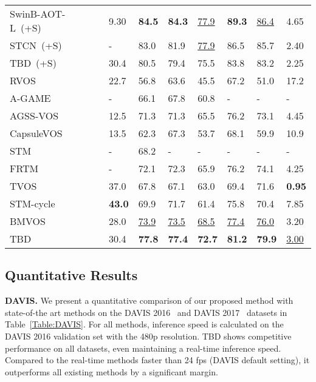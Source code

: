 \documentclass[runningheads]{llncs}
\begin{document}
\begin{table}[h!]
\begin{tabular}{lP{0.8cm}P{1cm}P{1cm}P{1cm}P{1cm}P{1cm}P{1cm}P{1cm}}
		SwinB-AOT-L~(+S)~\cite{AOT} & &9.30 &\textbf{84.5} &\textbf{84.3} &\underline{77.9} &\textbf{89.3} &\underline{86.4} &4.65\\
		STCN~(+S)~\cite{STCN} & &- &83.0 &81.9 &\underline{77.9} &86.5 &85.7 &2.40\\
		TBD~(+S) & &30.4 &80.5 &79.4 &75.5 &83.8 &83.2 &2.25\\
		\hline
		RVOS~\cite{RVOS} & &22.7 &56.8 &63.6 &45.5 &67.2 &51.0 &17.2\\
        A-GAME~\cite{A-GAME} & &- &66.1 &67.8 &60.8 &- &- &-\\
		AGSS-VOS~\cite{AGSS-VOS} & &12.5 &71.3 &71.3 &65.5 &76.2 &73.1 &4.45\\
		CapsuleVOS~\cite{CapsuleVOS} & &13.5 &62.3 &67.3 &53.7 &68.1 &59.9 &10.9\\
		STM~\cite{STM} & &- &68.2 &- &- &- &- &-\\
		FRTM~\cite{FRTM} &\checkmark &- &72.1 &72.3 &65.9 &76.2 &74.1 &4.25\\
		TVOS~\cite{TVOS} & &37.0 &67.8 &67.1 &63.0 &69.4 &71.6 &\textbf{0.95}\\
		STM-cycle~\cite{STM-cycle} & &\textbf{43.0} &69.9 &71.7 &61.4 &75.8 &70.4 &7.85\\
		BMVOS~\cite{BMVOS} & &28.0 &\underline{73.9} &\underline{73.5} &\underline{68.5} &\underline{77.4} &\underline{76.0} &3.20\\
		TBD & &30.4 &\textbf{77.8} &\textbf{77.4} &\textbf{72.7} &\textbf{81.2} &\textbf{79.9} &\underline{3.00}\\
		\hline
	\end{tabular}
	\label{Table:YTVOS}
\end{table}



\subsection{Quantitative Results}
\label{quantitative}
\noindent\textbf{DAVIS.} We present a quantitative comparison of our proposed method with state-of-the art methods on the DAVIS 2016~\cite{DAVIS2016} and DAVIS 2017~\cite{DAVIS2017} datasets in Table~\ref{Table:DAVIS}. For all methods, inference speed is calculated on the DAVIS 2016 validation set with the 480p resolution. TBD shows competitive performance on all datasets, even maintaining a real-time inference speed. Compared to the real-time methods faster than 24 fps (DAVIS default setting), it outperforms all existing methods by a significant margin.
\end{document}
